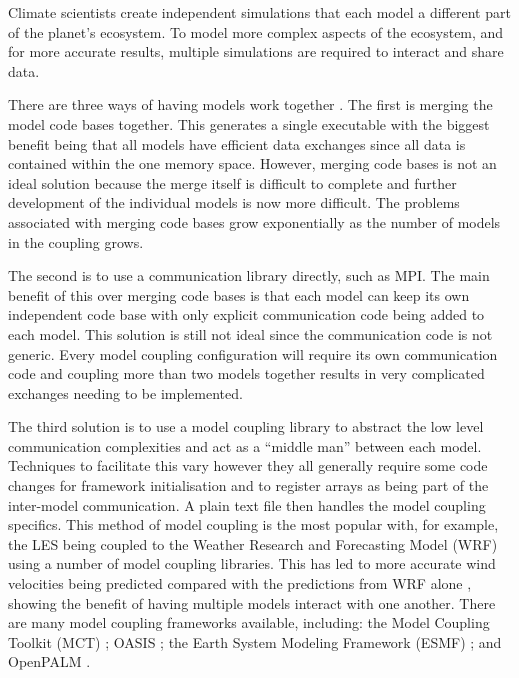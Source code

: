 Climate scientists create independent simulations that each model a different
part of the planet's ecosystem. To model more complex aspects of the ecosystem,
and for more accurate results, multiple simulations are required to interact and
share data.

There are three ways of having models work together \cite{Thevenin}. The first
is merging the model code bases together. This generates a single executable
with the biggest benefit being that all models have efficient data exchanges
since all data is contained within the one memory space. However, merging code
bases is not an ideal solution because the merge itself is difficult to complete
and further development of the individual models is now more difficult. The
problems associated with merging code bases grow exponentially as the number of
models in the coupling grows.

The second is to use a communication library directly, such as MPI. The main
benefit of this over merging code bases is that each model can keep its own
independent code base with only explicit communication code being added to each
model. This solution is still not ideal since the communication code is not
generic. Every model coupling configuration will require its own communication
code and coupling more than two models together results in very complicated
exchanges needing to be implemented.

The third solution is to use a model coupling library to abstract the low level
communication complexities and act as a ``middle man'' between each model.
Techniques to facilitate this vary however they all generally require some code
changes for framework initialisation and to register arrays as being part of the
inter-model communication. A plain text file then handles the model coupling
specifics. This method of model coupling is the most popular with, for example,
the LES being coupled to the Weather Research and Forecasting Model (WRF) using
a number of model coupling libraries. This has led to more accurate wind
velocities being predicted compared with the predictions from WRF alone
\cite{Kinbara2010,Nakayama1998}, showing the benefit of having multiple models
interact with one another. There are many model coupling frameworks available,
including: the Model Coupling Toolkit (MCT) \cite{Jacob2005,Larson2005}; OASIS
\cite{Valcke2013,Valcke}; the Earth System Modeling Framework (ESMF)
\cite{Ramework2004}; and OpenPALM \cite{Piacentini2011}.
